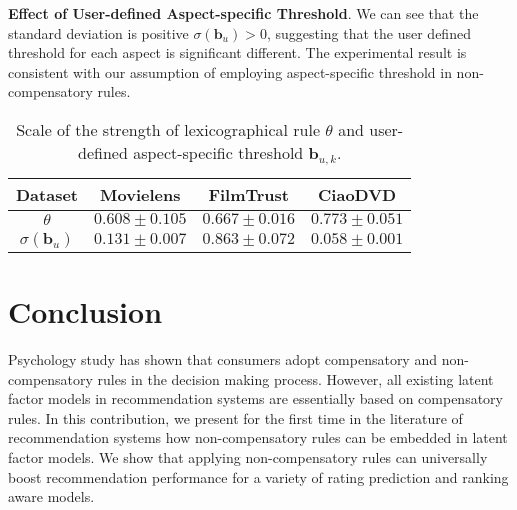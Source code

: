 \documentclass[letterpaper]{article} %
\begin{document}
\textbf{Effect of User-defined Aspect-specific Threshold}. We can see that the standard deviation is positive $\sigma(\mathbf{b}_{u})>0$, suggesting that the user defined threshold for each aspect is significant different. The experimental result is consistent with our assumption of employing aspect-specific threshold in non-compensatory rules. 


\begin{table}[htp]
\tiny
\caption{Scale of the strength of lexicographical rule $\theta$ and user-defined aspect-specific threshold $\mathbf{b}_{u,k}$.}
\begin{center}
\begin{tabular}{|c|c|c|c|}
\hline
Dataset & Movielens & FilmTrust & CiaoDVD \\\hline
$\theta$ & $0.608\pm 0.105$ & $0.667\pm 0.016$ &	$0.773\pm 0.051$\\\hline
$\sigma(\mathbf{b}_{u})$ & $0.131\pm 0.007$ &	$0.863\pm 0.072$	& $0.058\pm 0.001$  \\\hline
\end{tabular}
\end{center}
\label{tab:parameters}
\end{table}%



\section{Conclusion}\label{sec:conclusion}
Psychology study has shown that consumers adopt compensatory and non-compensatory rules in the decision making process. However, all existing latent factor models in recommendation systems are essentially based on compensatory rules. In this contribution, we present for the first time in the literature of recommendation systems how non-compensatory rules can be embedded in latent factor models. We show that applying non-compensatory rules can universally boost recommendation performance for a variety of rating prediction and ranking aware models. 



\end{document}
